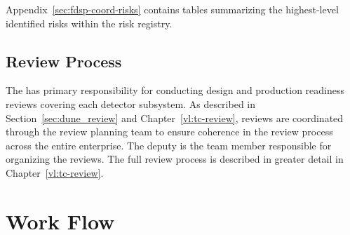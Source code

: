 Appendix~\ref{sec:fdsp-coord-risks} contains tables summarizing the 
highest-level identified risks within the  risk registry.

\subsection{Review Process}

The  has primary responsibility for conducting design 
and production readiness reviews covering each detector subsystem.  As 
described in Section~\ref{sec:dune_review} and Chapter~\ref{vl:tc-review}, 
reviews are coordinated through the  review planning team to 
ensure coherence in the review process across the entire  
enterprise.  The deputy  is the  
team member responsible for organizing the reviews.  The full review process is 
described in greater detail in Chapter~\ref{vl:tc-review}.

\section{ Work Flow}
\label{sec:workflow}

